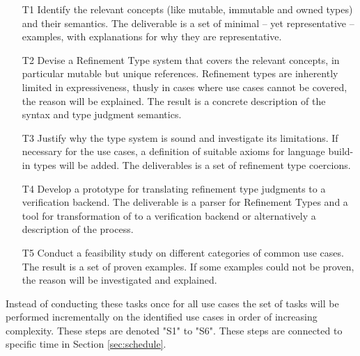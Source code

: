 \documentclass[11pt]{article}
\begin{document}
\begin{itemize}
	\item[T1] Identify the relevant concepts (like mutable, immutable and owned types) and their semantics. The deliverable is a set of minimal -- yet representative -- examples, with explanations for why they are representative.
	\item[T2] Devise a Refinement Type system that covers the relevant concepts, in particular mutable but unique references. Refinement types are inherently limited in expressiveness, thusly in cases where use cases cannot be covered, the reason will be explained. The result is a concrete description of the syntax and type judgment semantics.
	\item[T3] Justify why the type system is sound and investigate its limitations. If necessary for the use cases, a definition of suitable axioms for language build-in types will be added. The deliverables is a set of refinement type coercions.
	\item[T4] Develop a prototype for translating refinement type judgments to a verification backend. The deliverable is a parser for Refinement Types and a tool for transformation of to a verification backend or alternatively a description of the process.
	\item[T5] Conduct a feasibility study on different categories of common use cases. The result is a set of proven examples. If some examples could not be proven, the reason will be investigated and explained.
\end{itemize}

Instead of conducting these tasks once for all use cases the set of tasks will be performed incrementally on the identified use cases in order of increasing complexity. These steps are denoted "S1" to "S6". These steps are connected to specific time in Section \ref{sec:schedule}.
\end{document}
